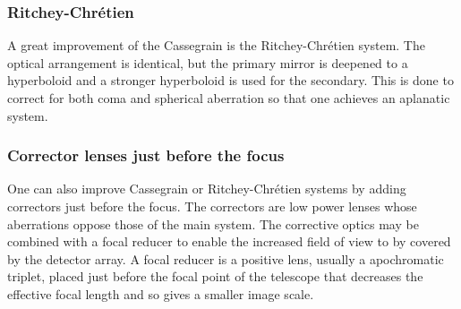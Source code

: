 \subsubsection{Ritchey-Chr\'{e}tien}
A great improvement of the Cassegrain is the Ritchey-Chr{\'e}tien system.
The optical arrangement is identical, but the
primary mirror is deepened to a hyperboloid and a stronger 
hyperboloid is used for the secondary. This is done to correct for both coma and 
spherical aberration so that one achieves an aplanatic system. 

\subsubsection{Corrector lenses just before the focus}
One can also improve Cassegrain
or Ritchey-Chr\'etien systems by adding correctors just before the focus. 
The correctors are low power lenses whose aberrations oppose those of the main
system. The corrective optics may be combined with a focal reducer to enable 
the increased field of view to by covered by the detector array. A focal reducer
is a positive lens, usually a apochromatic triplet, placed just before the focal 
point of the telescope that decreases the effective focal length and so gives 
a smaller image scale.

